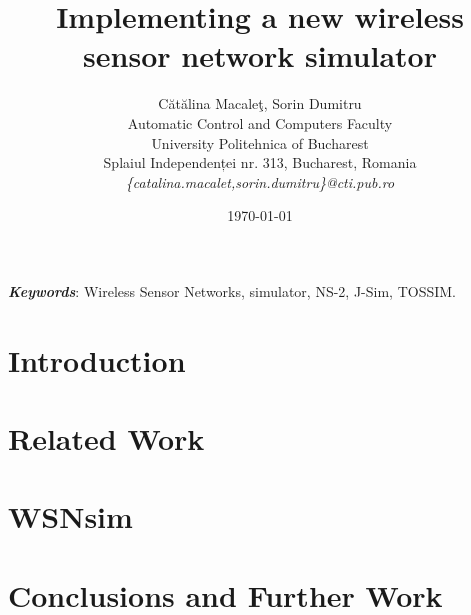 \documentclass[12pt]{article}
\title{Implementing a new wireless sensor network simulator}
\author{C\u{a}t\u{a}lina Macale\c{t}, Sorin Dumitru\\
Automatic Control and Computers Faculty\\
University Politehnica of Bucharest\\
Splaiul Independenței nr. 313, Bucharest, Romania \\
\emph{\{catalina.macalet,sorin.dumitru\}@cti.pub.ro}}
\date{\today}
\newcommand{\codename}{WSNsim }
\begin{document}
\nocite{*}
\maketitle

\begin{abstract}

\end{abstract}

\textit{\textbf{Keywords}}: Wireless Sensor Networks, simulator, NS-2, J-Sim, TOSSIM.

\section{Introduction}
\label{sec:introduction}


\section{Related Work}
\label{sec:relatedwork}


\section{\codename}
\label{sec:simulator}


\section{Conclusions and Further Work}
\label{sec:conclusion}

\newpage


\end{document}
